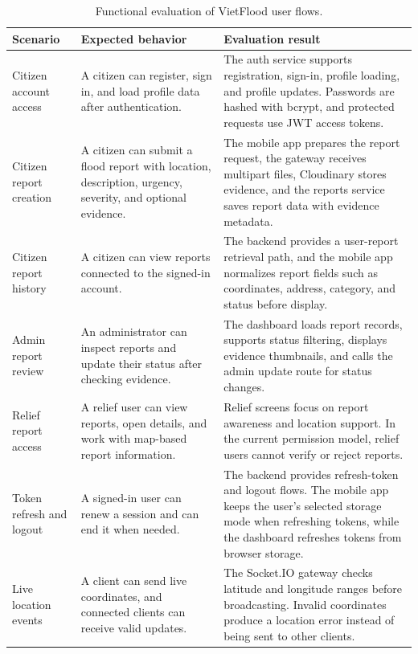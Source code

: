 \begin{table}[H]
    \centering
    \caption{Functional evaluation of VietFlood user flows.}
    \small
    \setlength{\tabcolsep}{6pt}
    \renewcommand{\arraystretch}{1.32}
    \begin{tabular}{|p{3.3cm}|p{5.0cm}|p{6.3cm}|}
        \hline
        \textbf{Scenario} & \textbf{Expected behavior} & \textbf{Evaluation result} \\
        \hline
        Citizen account access & A citizen can register, sign in, and load profile data after authentication. & The auth service supports registration, sign-in, profile loading, and profile updates. Passwords are hashed with bcrypt, and protected requests use JWT access tokens. \\
        \hline
        Citizen report creation & A citizen can submit a flood report with location, description, urgency, severity, and optional evidence. & The mobile app prepares the report request, the gateway receives multipart files, Cloudinary stores evidence, and the reports service saves report data with evidence metadata. \\
        \hline
        Citizen report history & A citizen can view reports connected to the signed-in account. & The backend provides a user-report retrieval path, and the mobile app normalizes report fields such as coordinates, address, category, and status before display. \\
        \hline
        Admin report review & An administrator can inspect reports and update their status after checking evidence. & The dashboard loads report records, supports status filtering, displays evidence thumbnails, and calls the admin update route for status changes. \\
        \hline
        Relief report access & A relief user can view reports, open details, and work with map-based report information. & Relief screens focus on report awareness and location support. In the current permission model, relief users cannot verify or reject reports. \\
        \hline
        Token refresh and logout & A signed-in user can renew a session and can end it when needed. & The backend provides refresh-token and logout flows. The mobile app keeps the user's selected storage mode when refreshing tokens, while the dashboard refreshes tokens from browser storage. \\
        \hline
        Live location events & A client can send live coordinates, and connected clients can receive valid updates. & The Socket.IO gateway checks latitude and longitude ranges before broadcasting. Invalid coordinates produce a location error instead of being sent to other clients. \\
        \hline
    \end{tabular}
    \label{tab:vietflood-functional-evaluation}
\end{table}

